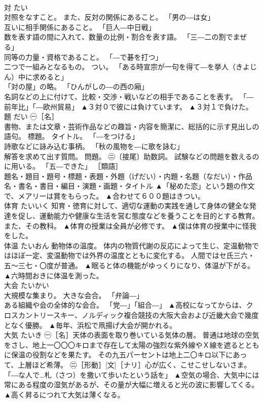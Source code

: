 \documentclass[8pt]{extreport}
\begin{document}
\begin{CJK}{UTF8}{min}
\\	対	たい	
\\	対照をなすこと。 また、反対の関係にあること。 「男の―は女」 
\\	互いに相手関係にあること。 「巨人―中日戦」 
\\	数を表す語の間に入れて、数量の比例・割合を表す語。 「三―二の割でまぜる」 
\\	同等の力量・資格であること。 「―で碁を打つ」 
\\	二つで一組みとなるもの。 つい。 「ある時宣宗が一句を得て―を挙人（きよじん）中に求めると」 
\\	「対の屋」の略。 「ひんがしの―の西の廂」 
\\	名詞などの上に付けて、比較・交渉・戦いなどの相手であることを表す。 「―前年比」「―欧州貿易」	▲３対０で彼には負けています。 ▲３対１で負けた。
\\	題	だい	㊀［名］ 
\\	書物、または文章・芸術作品などの趣旨・内容を簡潔に、総括的に示す見出しの語句。 標題。 タイトル。 「―をつける」 
\\	詩歌などに詠み込む事柄。 「秋の風物を―に歌を詠む」 
\\	解答を求めて出す質問。 問題。 ㊁〔接尾〕助数詞。 試験などの問題を数えるのに用いる。 「五―できた」 ［類語］ 
\\	題名・題目・題号・標題・表題・外題（げだい）・内題・名題（なだい）・作品名・書名・書目・編目・演題・画題・タイトル	▲「秘めた恋」という題の作文で、メアリーは賞をもらった。 ▲合わせて６００題はきつい。
\\	体育	たいいく	知育・徳育に対して、適切な運動の実践を通して身体の健全な発達を促し、運動能力や健康な生活を営む態度などを養うことを目的とする教育。 また、その教科。	▲体育の授業は全員が必修です。 ▲僕は体育の授業中に怪我をした。
\\	体温	たいおん	動物体の温度。 体内の物質代謝の反応によって生じ、定温動物ではほぼ一定、変温動物では外界の温度とともに変化する。 人間ではセ氏三六・五〜三七・〇度が普通。	▲眠ると体の機能がゆっくりになり、体温が下がる。 ▲六時間おきに体温を測った。
\\	大会	たいかい	
\\	大規模な集まり。 大きな会合。 「弁論―」 
\\	ある組織や会の全体的な会合。 「党―」「組合―」	▲高校になってからは、クロスカントリースキー、ノルディック複合競技の大阪大会および近畿大会で幾度となく優勝。 ▲毎年、浜松で凧揚げ大会が開かれる。
\\	大気	たいき	㊀［名］天体の表面を取り巻いている気体の層。 普通は地球の空気をさし、地上一〇〇〇キロまで存在して太陽の強烈な紫外線やＸ線を遮るとともに保温の役割などを果たす。 その九五パーセントは地上二〇キロ以下にあって、上層ほど希薄。 ㊁［形動］[文]［ナリ］心が広く、こせこせしないさま。 「―な人で…札（さつ）を撒いて歩いたという話を」	▲空気の場合、大気中には常にある程度の湿気があるが、その量が大幅に増えると光の波に影響してくる。 ▲高く昇るにつれて大気は薄くなる。

\end{CJK}
\end{document}
